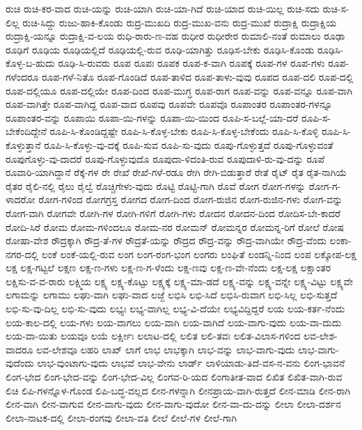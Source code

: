 ರುಚಿ
ರುಚಿ-ಕರ-ವಾದ
ರುಚಿ-ಯನ್ನು
ರುಚಿ-ಯಾಗಿ
ರುಚಿ-ಯಾ-ಗಿದೆ
ರುಚಿ-ಯಾದ
ರುಚಿ-ಯಿಲ್ಲ
ರುಚಿ-ಸದು
ರುಚಿ-ಸ-ಲಿಲ್ಲ
ರುಚಿ-ಸಿದ್ದು
ರುಜು-ಹಾಕಿ-ಕೊಂಡು
ರುದ್ರ-ಮುಖದಿ
ರುದ್ರ-ಮುಖ-ವನು
ರುದ್ರ-ಮುಖೆ
ರುದ್ರಾಕ್ಷಿ
ರುದ್ರಾಕ್ಷಿಯ
ರುದ್ರಾಕ್ಷಿ-ಯನ್ನೂ
ರುದ್ರಾಕ್ಷಿ-ವ-ಲಯ
ರುಧಿ-ರಾರು-ಣ-ವಹ
ರುಧೀರ
ರುಧೀರೇರ
ರುಮಾಲಿ-ನಂತೆ
ರುಮಾಲು
ರೂಢಾ
ರೂಢಿಗೆ
ರೂಢಿಯ
ರೂಢಿಯಲ್ಲಿದೆ
ರೂಢಿಯಲ್ಲಿ-ರುವ
ರೂಢಿ-ಯಾಗಿತ್ತು
ರೂಢಿಸ-ಬೇಕು
ರೂಢಿಸಿ-ಕೊಂಡು
ರೂಢಿಸಿ-ಕೊಳ್ಳ-ಬ-ಹುದು
ರೂಢಿ-ಸಿ-ರುವರು
ರೂಪ
ರೂಪಃ
ರೂಪಕ
ರೂಪ-ಕ-ವಾಗಿ
ರೂಪಕ್ಕೆ
ರೂಪ-ಗಳ
ರೂಪ-ಗಳು
ರೂಪ-ಗಳೆಂದರೂ
ರೂಪ-ಗಳೆ-ನಿತೊ
ರೂಪ-ಗೊಂಡಿದೆ
ರೂಪ-ತಾಳಿದ
ರೂಪ-ತಾಳು-ವುವು
ರೂಪದ
ರೂಪ-ದಲಿ
ರೂಪ-ದಲ್ಲಿ
ರೂಪ-ದಲ್ಲಿಯೂ
ರೂಪ-ದಲ್ಲಿಯೇ
ರೂಪ-ದಿಂದ
ರೂಪ-ಮುಗ್ಧ
ರೂಪ-ರಾಗ
ರೂಪ-ವನ್ನು
ರೂಪ-ವನ್ನೂ
ರೂಪ-ವಾಗಿ
ರೂಪ-ವಾಗಿತ್ತೇ
ರೂಪ-ವಾಗಿದ್ದ
ರೂಪ-ವಾದ
ರೂಪವು
ರೂಪವೇ
ರೂಪವೊ
ರೂಪಾಂತರ
ರೂಪಾಂತರ-ಗಳನ್ನೂ
ರೂಪಾಂತರ-ವನ್ನು
ರೂಪಾಯಿ
ರೂಪಾ-ಯಿ-ಗಳನ್ನು
ರೂಪಾ-ಯಿ-ಯಿಂದ
ರೂಪಿ-ಸ-ಬಲ್ಲೆ-ಯಾ-ದರೆ
ರೂಪಿ-ಸ-ಬೇಕೆಂದಿದ್ದೇನೆ
ರೂಪಿ-ಸಿ-ಕೊಂಡಿದ್ದಷ್ಟೇ
ರೂಪಿ-ಸಿ-ಕೊಳ್ಳ-ಬೇಕು
ರೂಪಿ-ಸಿ-ಕೊಳ್ಳ-ಬೇಕೆಂದು
ರೂಪಿ-ಸಿ-ಕೊಳ್ಳಿ
ರೂಪಿ-ಸಿ-ಕೊಳ್ಳುತ್ತಾನೆ
ರೂಪಿ-ಸಿ-ಕೊಳ್ಳು-ವು-ದಕ್ಕೆ
ರೂಪಿ-ಸುವ
ರೂಪಿ-ಸು-ವುದು
ರೂಪು-ಗೊಳ್ಳುತ್ತದೆ
ರೂಪು-ಗೊಳ್ಳುವಂತೆ
ರೂಪುಗೊಳ್ಳು-ವು-ದಾದರೆ
ರೂಪು-ಗೊಳ್ಳುವುದೊ
ರೂಪುದಾ-ಳಿದಂತಿ-ರುವ
ರೂಪುದಾಳಿ-ರು-ವು-ದನ್ನು
ರೂಪೆ
ರೂವಾರಿ-ಯಾಗಿದ್ದಾನೆ
ರೆಕ್ಕೆ-ಗಳ
ರೇ
ರೇಖೆ
ರೇಖೆ-ಗಳೆ-ರಡೂ
ರೇಗಿ
ರೇಗಿ-ಬಿಡುತ್ತಾರೆ
ರೇತೆ
ರೈಟ್
ರೈತ
ರೈತ-ನಾಗಿಯೆ
ರೈತರ
ರೈಲಿ-ನಲ್ಲಿ
ರೈಲು
ರೈಲ್ವೆ
ರೊಚ್ಚಿಗೇಳು-ವುದು
ರೊಟ್ಟಿ
ರೊಟ್ಟಿ-ಗಾಗಿ
ರೊವೆ
ರೋಗ
ರೋಗ-ಗಳನ್ನು
ರೋಗ-ಗ-ಳಾದರೋ
ರೋಗ-ಗಳಿಂದ
ರೋಗಗ್ರಸ್ತ
ರೋಗದ
ರೋಗ-ದಿಂದ
ರೋಗ-ರುಜಿನ
ರೋಗ-ರುಜಿನ-ಗಳು
ರೋಗ-ವನ್ನು
ರೋಗ-ವಾಗಿ
ರೋಗವೇ
ರೋಗಿ-ಗಳ
ರೋಗಿ-ಗಳಿಗೆ
ರೋಗಿ-ಗಳು
ರೋದನ
ರೋದನ-ದಿಂದ
ರೋದಿಸ-ಬೇ-ಕಾದರೆ
ರೋದಿ-ಸಿರೆ
ರೋಮ
ರೋಮ-ಗಳಿಂದಲೂ
ರೋಮ-ನರ
ರೋಮನ್
ರೋಮನ್ನರ
ರೋಮನ್ನ-ರಿಗೆ
ರೋಲೆ
ರೋಷ
ರೋಷಾ-ವೇಶ
ರೌದ್ರಕ್ಕಾಗಿ
ರೌದ್ರ-ತೆ-ಗಳ
ರೌದ್ರತೆ-ಯನ್ನು
ರೌದ್ರದ
ರೌದ್ರ-ವನ್ನು
ರೌದ್ರ-ವಾಗಿಯೇ
ರೌದ್ರ-ವೆಂದು
ಲಂಕಾ-ನಗರ-ದಲ್ಲಿ
ಲಂಕೆ
ಲಂಕೆ-ಯಲ್ಲಿ-ರುವ
ಲಂಗ
ಲಂಗ-ರಂಗ-ಭಂಗ
ಲಂಗರು
ಲಂಘಿತೆ
ಲಂಡನ್ನಿ-ನಿಂದ
ಲಂಪ
ಲಕ್ಕೋಪ-ಲಕ್ಷ
ಲಕ್ಷ
ಲಕ್ಷ-ಗಟ್ಟಲೆ
ಲಕ್ಷಣ
ಲಕ್ಷ-ಣ-ಗಳು
ಲಕ್ಷ-ಣ-ಗ-ಳೆಂದು
ಲಕ್ಷ-ಣವು
ಲಕ್ಷ-ಣ-ವೇ-ನೆಂದು
ಲಕ್ಷ-ಲಕ್ಷ
ಲಕ್ಷಾಂತರ
ಲಕ್ಷಿಸು-ವ-ವ-ರಾರು
ಲಕ್ಷ್ಮಿಯ
ಲಕ್ಷ್ಯ
ಲಕ್ಷ್ಯ-ಕೊಟ್ಟು
ಲಕ್ಷ್ಯಕ್ಕೆ
ಲಕ್ಷ್ಯ-ಮಾ-ಡದೆ
ಲಕ್ಷ್ಯ-ವನ್ನು
ಲಕ್ಷ್ಯ-ವನ್ನೇ
ಲಕ್ಷ್ಯ-ವಿಟ್ಟು
ಲಕ್ಷ್ಯವೇ
ಲಗಾಮನ್ನು
ಲಗಾಮು
ಲಘು-ವಾಗಿ
ಲಘು-ವಾದ
ಲಜ್ಜೆ
ಲಭಿಸಿ
ಲಭಿ-ಸಿದೆ
ಲಭಿಸಿ-ರುವಾಗ
ಲಭಿ-ಸಿಲ್ಲ
ಲಭಿ-ಸುತ್ತದೆ
ಲಭಿ-ಸು-ವು-ದಿಲ್ಲ
ಲಭಿ-ಸು-ವುದು
ಲಭ್ಯಃ
ಲಭ್ಯ-ವಾಗಿಲ್ಲ
ಲಭ್ಯ-ವಿ-ದೆಯೇ
ಲಭ್ಯವಿದ್ದಿದ್ದರೆ
ಲಯ
ಲಯ-ಕರ್ತ-ನೆಂದು
ಲಯ-ಕಾಲ-ದಲ್ಲಿ
ಲಯ-ಗಳು
ಲಯ-ವಾಗಲು
ಲಯ-ವಾಗಿ
ಲಯ-ವಾಗಿದೆ
ಲಯ-ವಾಗು-ವುದು
ಲಯ-ವಾ-ದುದು
ಲಯ-ವಾ-ಯಿತು
ಲಯವೂ
ಲಯೆ
ಲರ್ಕ್ಷೀಃ
ಲಲಾಟ-ದಲ್ಲಿ
ಲಲಿತ
ಲಲಿ-ತವಃ
ಲಲಿತ-ವಿಲಾಸ-ಗಳಿಂದ
ಲವ-ಲೇಶ-ವಾದರೂ
ಲವ-ಲೇಶವೂ
ಲಹರಿ
ಲಾಖ್
ಲಾಗೆ
ಲಾಭ
ಲಾಭಕ್ಕಾಗಿ
ಲಾಭ-ವನ್ನು
ಲಾಭ-ವಾಗು-ವುದು
ಲಾಭ-ವಾಗು-ವುದೆಂದು
ಲಾಭ-ವುಂಟಾಗು-ವುದು
ಲಾಭವೆ
ಲಾಭ-ವೇನು
ಲಾರ್ಡ್
ಲಾಳಿಯಾಡು-ತಿದೆ-ವಸ-ನ-ವನು
ಲಿಂಗ-ಭಾವನೆ
ಲಿಂಗ-ಭೇದ
ಲಿಂಗ-ಭೇದ-ವನ್ನು
ಲಿಂಗ-ಭೇದ-ವಿಲ್ಲ
ಲಿಂಗವ-ರಿ-ಯದ
ಲಿಂಗಾತೀತ-ವಾದ
ಲಿಖಿತ
ಲಿಖಿತ-ವಾಗಿ-ರುವ
ಲಿಚಿ
ಲಿಪಿ-ಗಳನ್ನೊಳ-ಗೊಂಡ
ಲಿಪಿ-ಬದ್ಧ-ವಲ್ಲದ
ಲೀನ-ಗಳನ್ನಾಗಿ
ಲೀನಪ್ರಾಯ-ವಾಗಿ-ರುತ್ತದೆ
ಲೀನ-ಮಾಡಿ
ಲೀನ-ರಾಗಿ
ಲೀನ-ವಾಗಿ
ಲೀನ-ವಾಗುವ
ಲೀನ-ವಾಗು-ವುದು
ಲೀನ-ವಾಗು-ವುದೋ
ಲೀನ-ವಾ-ದು-ದನ್ನು
ಲೀಲಾ
ಲೀಲಾ-ದರ್ಶನ
ಲೀಲಾ-ನಾಟಕ-ದಲ್ಲಿ
ಲೀಲಾ-ರಂಗವು
ಲೀಲಾ-ವತಿ
ಲೀಲೆ
ಲೀಲೆ-ಗಳ
ಲೀಲೆ-ಗಾಗಿ
